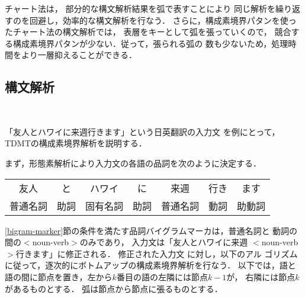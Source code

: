 チャート法は，
部分的な構文解析結果を弧で表すことにより
同じ解析を繰り返すのを回避し，効率的な構文解析を行なう．
さらに，構成素境界パタンを使ったチャート法の構文解析では，
表層をキーとして弧を張っていくので，
競合する構成素境界パタンが少ない．従って，張られる弧の
数も少ないため，処理時間をより一層抑えることができる．

\subsection{構文解析}~\label{algorithm}

「友人とハワイに来週行きます」という日英翻訳の入力文
を例にとって，TDMTの構成素境界解析を説明する．

まず，形態素解析により入力文の各語の品詞を次のように決定する．

\begin{small}
\begin{center}
\begin{tabular}{ccccccc}
友人&と&ハワイ&に&来週&行き&ます\\
普通名詞&助詞&固有名詞&助詞&普通名詞&動詞&助動詞
\end{tabular}
\end{center}
\end{small}

\ref{bigram-marker}節の条件を満たす品詞バイグラムマーカは，普通名詞と
動詞の間の{\footnotesize $<$}noun-verb{\footnotesize $>$}のみであり，
入力文は「友人とハワイに来週
{\footnotesize $<$}noun-verb{\footnotesize $>$}行きます」に修正される．
修正された入力文\break
に対し，以下のアル
ゴリズムに従って，逐次的にボトムアップの構成素境界解析を行なう．
以下では，語と語の間に節点を置き，左から$k$番目の語の左隣には節点{\small $k-1$}が，
右隣には節点{\small $k$}があるものとする．
弧は節点から節点に張るものとする．
\vspace*{6mm}

